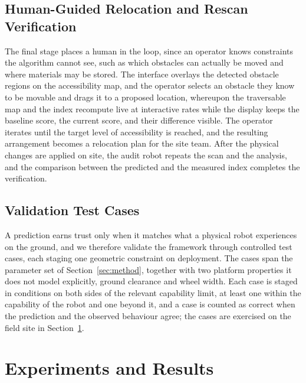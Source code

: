 \documentclass[a4paper, 10pt, conference]{ieeeconf}
\begin{document}
\subsection{Human-Guided Relocation and Rescan Verification}
\label{sec:relocation}
The final stage places a human in the loop, since an operator knows constraints the algorithm cannot see, such as which obstacles can actually be moved and where materials may be stored. The interface overlays the detected obstacle regions on the accessibility map, and the operator selects an obstacle they know to be movable and drags it to a proposed location, whereupon the traversable map and the index recompute live at interactive rates
while the display keeps the baseline score, the current score, and their difference visible. The operator iterates until the target level of accessibility is reached, and the resulting arrangement becomes a relocation plan for the site team. After the physical changes are applied on site, the audit robot repeats the scan and the analysis, and the comparison between the predicted and the measured index completes the verification.
 
\subsection{Validation Test Cases}
\label{sec:testcases}
A prediction earns trust only when it matches what a physical robot experiences on the ground, and we therefore validate the framework through controlled test cases, each staging one geometric constraint on deployment. The cases span the parameter set of Section~\ref{sec:method}, together with two platform properties it does not model explicitly, ground clearance and wheel width. Each case is staged in conditions on both sides of the relevant capability limit, at least one within the capability of the robot and one beyond it, and a case is counted as correct when the prediction and the observed behaviour agree; the cases are exercised on the field site in Section~\ref{sec:results}.


\section{Experiments and Results}
\label{sec:results}
 
\end{document}
